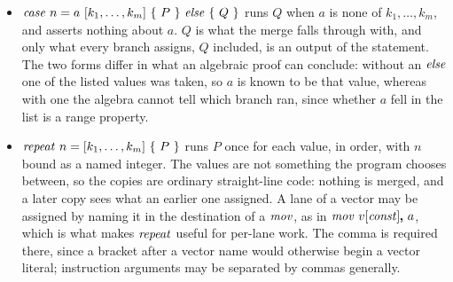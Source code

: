 \documentclass{article}
\begin{document}
\begin{itemize}
  $[0, 1, 2, 3]$, and the values must be distinct.
  The body refers to the bound value as $\$n$, which lets it stand
  where an instruction requires a constant rather than an atom, such as
  the position of a $\isplit$ or the index of a vector element.
  A $\icut$ may not appear in $P$.
  The statement asserts that $a$ is one of $k_1, \ldots, k_m$, so a
  program that can reach it with any other value fails to verify.
\item $\icase\ n = a\ [k_1, \ldots, k_m]\ \{\ P\ \}\ \ielse\ \{\ Q\ \}$
  runs $Q$ when $a$ is none of $k_1, \ldots, k_m$, and asserts nothing
  about $a$.
  $Q$ is what the merge falls through with, and only what every branch
  assigns, $Q$ included, is an output of the statement.
  The two forms differ in what an algebraic proof can conclude: without
  an $\mathit{else}$ one of the listed values was taken, so $a$ is known to be
  that value, whereas with one the algebra cannot tell which branch ran,
  since whether $a$ fell in the list is a range property.
\item $\irepeat\ n = [k_1, \ldots, k_m]\ \{\ P\ \}$ runs $P$ once for
  each value, in order, with $n$ bound as a named integer.
  The values are not something the program chooses between, so the
  copies are ordinary straight-line code: nothing is merged, and a later
  copy sees what an earlier one assigned.
  A lane of a vector may be assigned by naming it in the destination of
  a $\mathit{mov}$, as in $\mathit{mov}\ v[\mathit{const}]\pmb{,}\ a$, which is what makes
  $\mathit{repeat}$ useful for per-lane work.
  The comma is required there, since a bracket after a vector name would
  otherwise begin a vector literal; instruction arguments may be
  separated by commas generally.
\end{itemize}
\end{document}
